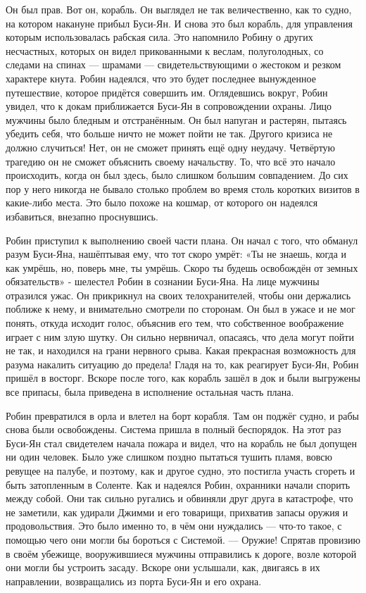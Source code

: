 \documentclass[a4paper,12pt]{book}
\begin{document}
	Он был прав. Вот он, корабль. Он выглядел не так величественно, как то судно, на котором накануне прибыл Буси-Ян. И снова это был корабль, для управления которым использовалась рабская сила. Это напомнило Робину о других несчастных, которых он видел прикованными к веслам, полуголодных, со следами на спинах — шрамами — свидетельствующими о жестоком и резком характере кнута. Робин надеялся, что это будет последнее вынужденное путешествие, которое придётся совершить им.
	Оглядевшись вокруг, Робин увидел, что к докам приближается Буси-Ян в сопровождении охраны. Лицо мужчины было бледным и отстранённым. Он был напуган и растерян, пытаясь убедить себя, что больше ничто не может пойти не так. Другого кризиса не должно случиться! Нет, он не сможет принять ещё одну неудачу. Четвёртую трагедию он не сможет объяснить своему начальству. То, что всё это начало происходить, когда он был здесь, было слишком большим совпадением. До сих пор у него никогда не бывало столько проблем во время столь коротких визитов в какие-либо места. Это было похоже на кошмар, от которого он надеялся избавиться, внезапно проснувшись.

	Робин приступил к выполнению своей части плана.
	Он начал с того, что обманул разум Буси-Яна, нашёптывая ему, что тот скоро умрёт:
	«Ты не знаешь, когда и как умрёшь, но, поверь мне, ты умрёшь. Скоро ты будешь освобождён от земных обязательств» - шелестел Робин в сознании Буси-Яна.
	На лице мужчины отразился ужас. Он прикрикнул на своих телохранителей, чтобы они держались поближе к нему, и внимательно смотрели по сторонам. Он был в ужасе и не мог понять, откуда исходит голос, объяснив его тем, что собственное воображение играет с ним злую шутку. Он сильно нервничал, опасаясь, что дела могут пойти не так, и находился на грани нервного срыва. Какая прекрасная возможность для разума накалить ситуацию до предела! Гладя на то, как реагирует Буси-Ян, Робин пришёл в восторг.
	Вскоре после того, как корабль зашёл в док и были выгружены все припасы, была приведена в исполнение остальная часть плана.

	Робин превратился в орла и влетел на борт корабля. Там он поджёг судно, и рабы снова были освобождены. Система пришла в полный беспорядок. На этот раз Буси-Ян стал свидетелем начала пожара и видел, что на корабль не был допущен ни один человек. Было уже слишком поздно пытаться тушить пламя, вовсю ревущее на палубе, и поэтому, как и другое судно, это постигла участь сгореть и быть затопленным в Соленте.
	Как и надеялся Робин, охранники начали спорить между собой. Они так сильно ругались и обвиняли друг друга в катастрофе, что не заметили, как удирали Джимми и его товарищи, прихватив запасы оружия и продовольствия. Это было именно то, в чём они нуждались — что-то такое, с помощью чего они могли бы бороться с Системой.  — Оружие!
	Спрятав провизию в своём убежище, вооружившиеся мужчины отправились к дороге, возле которой они могли бы устроить засаду. Вскоре они услышали, как, двигаясь в их направлении, возвращались из порта Буси-Ян и его охрана.
\end{document}
